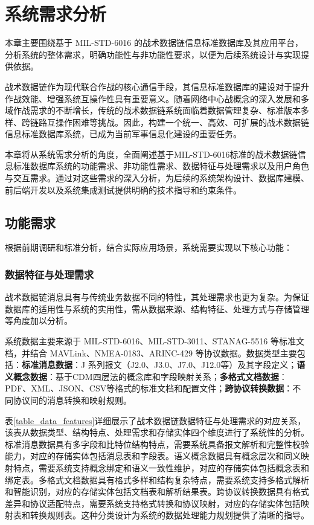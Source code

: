 \chapter{系统需求分析}

本章主要围绕基于 MIL-STD-6016 的战术数据链信息标准数据库及其应用平台，分析系统的整体需求，明确功能性与非功能性要求，以便为后续系统设计与实现提供依据。

战术数据链作为现代联合作战的核心通信手段，其信息标准数据库的建设对于提升作战效能、增强系统互操作性具有重要意义。随着网络中心战概念的深入发展和多域作战需求的不断增长，传统的战术数据链系统面临着数据管理复杂、标准版本多样、跨链路互操作困难等挑战。因此，构建一个统一、高效、可扩展的战术数据链信息标准数据库系统，已成为当前军事信息化建设的重要任务。

本章将从系统需求分析的角度，全面阐述基于MIL-STD-6016标准的战术数据链信息标准数据库系统的功能需求、非功能性需求、数据特征与处理需求以及用户角色与交互需求。通过对这些需求的深入分析，为后续的系统架构设计、数据库建模、前后端开发以及系统集成测试提供明确的技术指导和约束条件。

\section{功能需求}

根据前期调研和标准分析，结合实际应用场景，系统需要实现以下核心功能：

\subsection{数据特征与处理需求}
战术数据链消息具有与传统业务数据不同的特性，其处理需求也更为复杂。为保证数据库的适用性与系统的实用性，需从数据来源、结构特征、处理方式与存储管理等角度加以分析\cite{baek2016_jsac}。

系统数据主要来源于 {MIL-STD-6016}、{MIL-STD-3011}、{STANAG-5516} 等标准文档，并结合 {MAVLink}、{NMEA-0183}、{ARINC-429} 等协议数据。数据类型主要包括：\textbf{标准消息数据}：J 系列报文（J2.0、J3.0、J7.0、J12.0等）及其字段定义；\textbf{语义概念数据}：基于CDM四层法的概念库和字段映射关系；\textbf{多格式文档数据}：PDF、XML、JSON、CSV等格式的标准文档和配置文件；\textbf{跨协议转换数据}：不同协议间的消息转换和映射规则。

表\ref{table_data_features}详细展示了战术数据链数据特征与处理需求的对应关系，该表从数据类型、结构特点、处理需求和存储实体四个维度进行了系统性的分析。标准消息数据具有多字段和比特位结构特点，需要系统具备报文解析和完整性校验能力，对应的存储实体包括消息表和字段表。语义概念数据具有概念层次和同义映射特点，需要系统支持概念绑定和语义一致性维护，对应的存储实体包括概念表和绑定表。多格式文档数据具有格式多样和结构复杂特点，需要系统支持多格式解析和智能识别，对应的存储实体包括文档表和解析结果表。跨协议转换数据具有格式差异和协议适配特点，需要系统支持格式转换和协议映射，对应的存储实体包括映射表和转换规则表。这种分类设计为系统的数据处理能力规划提供了清晰的指导。

